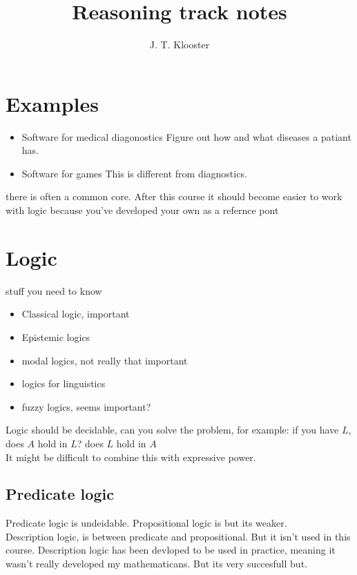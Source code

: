 \documentclass{report}
\begin{document}
\author{J. T. Klooster}
\title{Reasoning track notes}
\maketitle
\tableofcontents

\chapter{Examples}

\begin{itemize}
	\item Software for medical diagonostics
			Figure out how and what diseases a patiant has.
	\item Software for games
			This is different from diagnostics.
\end{itemize}

there is often a common core. After this course it should become easier to
work with logic because you've developed your own as a refernce pont

\chapter{Logic}
stuff you need to know

\begin{itemize}
		\item Classical logic, important
		\item Epistemic logics
		\item modal logics, not really that important
		\item logics for linguistics
		\item fuzzy logics, seems important?
\end{itemize}

Logic should be decidable, can you solve the problem, for example:
if you have $L$, does $A$ hold in $L$?
does $L$ hold in $A$ \\

It might be difficult to combine this with expressive power.

\section{Predicate logic}

Predicate logic is undeidable. Propositional logic is but its weaker. \\

Description logic, is between predicate and propositional. But it isn't
used in this course. Description logic has been devloped to be used in practice,
meaning it wasn't really developed my mathematicans. But its very succesfull but.
\end{document}
